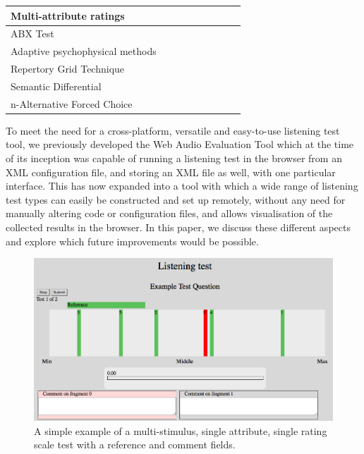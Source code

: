\documentclass{sig-alternate}
\begin{document}
\begin{table}[ht]
\begin{center}
\begin{tabular}{|*{9}{l|}}
	    		 Multi-attribute ratings & & & \checkmark & & & & & \checkmark \\ \hline
	    		 ABX Test & & \checkmark & \checkmark & & & & & \checkmark \\ \hline
	    		 Adaptive psychophysical methods & & & & & & & \checkmark & \\ \hline 
	    		 Repertory Grid Technique & & & & & & & \checkmark & \\ \hline
	    		 Semantic Differential  & & & & & & \checkmark & \checkmark &\checkmark \\ \hline
	    		 n-Alternative Forced Choice & & & & & & \checkmark & & \\ \hline
	    	\end{tabular}
	 \end{center}
	 \label{tab:toolboxes}
	 \end{table}

    To meet the need for a cross-platform, versatile and easy-to-use listening test tool, we previously developed the Web Audio Evaluation Tool \cite{waet} which at the time of its inception was capable of running a listening test in the browser from an XML configuration file, and storing an XML file as well, with one particular interface. This has now expanded into a tool with which a wide range of listening test types can easily be constructed and set up remotely, without any need for manually altering code or configuration files, and allows visualisation of the collected results in the browser. In this paper, we discuss these different aspects and explore which future improvements would be possible.

    \begin{figure}[tb]
    	\centering
    	\includegraphics[width=.5\textwidth]{interface.png}
    	\caption{A simple example of a multi-stimulus, single attribute, single rating scale test with a reference and comment fields.}
    	\label{fig:interface}
    \end{figure}
\end{document}
